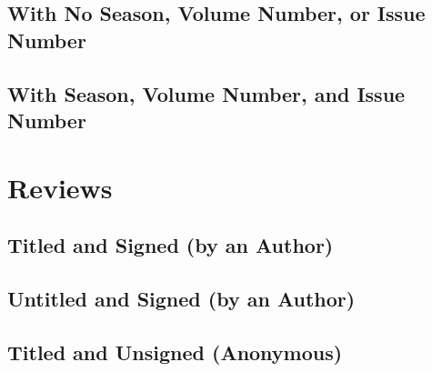 \documentclass{article}
\begin{document}
\subsection{With No Season, Volume Number, or Issue Number} %
\label{sub:with_no_season_volume_number_or_issue_number}
\begin{refsection}
	\nocite{Deresiewicz:un,Giant:ta}
	\printbibliography[heading=none]
\end{refsection}
\subsection{With Season, Volume Number, and Issue Number} %
\label{sub:with_season_volume_number_and_issue_number}
\begin{refsection}
	\nocite{Riis:2017vi}
	\printbibliography[heading=none]
\end{refsection}

\section{Reviews} %
\label{sec:reviews}
\subsection{Titled and Signed (by an Author)} %
\label{sub:titled_and_signed_by_an_author}
\begin{refsection}
	\nocite{Tommasini:tm}
	\printbibliography[heading=none]
\end{refsection}
\subsection{Untitled and Signed (by an Author)} %
\label{sub:untitled_and_signed_by_an_author}
\begin{refsection}
	\nocite{Rohrbaugh:aa}
	\printbibliography[heading=none]
\end{refsection}
\subsection{Titled and Unsigned (Anonymous)} %
\label{sub:titled_and_unsigned_anonymous}
\begin{refsection}
	\nocite{Racial:vh}
	\printbibliography[heading=none]
\end{refsection}
\end{document}
